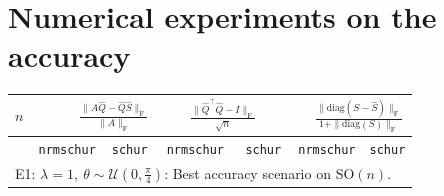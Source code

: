 \documentclass[10pt,twoside,dvipsnames]{siamart1116}
\numberwithin{algorithm}{section}
\numberwithin{equation}{section}
\begin{document}
	\section{Numerical experiments on the accuracy}\label{sec:exp_accuracy} 
	\begin{table}[ht]
	 
	 \centering
	 
	 \begin{tabular}{||c||c|c||c|c||c|c||}
	 \hline
	 $n$&\multicolumn{2}{l||}{\large$\quad\quad\quad\frac{\|A\widehat{Q} - \widehat{Q}\widehat{S}\|_\mathrm{F}}{\|A\|_\mathrm{F}}$}&\multicolumn{2}{l||}{\large $\quad\quad\frac{\|\widehat{Q}^\top \widehat{Q}- I\|_\mathrm{F}}{\sqrt{n}}\quad\quad$}&\multicolumn{2}{l||}{\large $\quad \ \frac{\|\mathrm{diag}(S-\widehat{S})\|_\mathrm{F}}{1+\|\mathrm{diag}(S)\|_\mathrm{F}}$}\\
	 \hline
	 &\texttt{nrmschur}&\texttt{schur}&\texttt{nrmschur}&\texttt{schur}&\texttt{nrmschur}&\texttt{schur}\\
	 \hline
	 \multicolumn{7}{||l||}{E1: $\lambda = 1,\ \theta\sim \mathcal{U}(0, \frac{\pi}{4})$: Best accuracy scenario on $\mathrm{SO}(n)$.}\\
 

\end{tabular}
\end{table}
\end{document}
